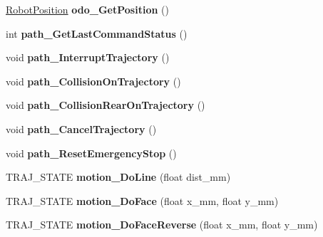 \begin{DoxyCompactItemize}
\mbox{\label{classAsservEsialR_a498af11ad6c351bbc908e1d81ff44044}} 
\hyperlink{structRobotPosition}{Robot\+Position} {\bfseries odo\+\_\+\+Get\+Position} ()
\item 
\mbox{\label{classAsservEsialR_a05e8f01586ff447aa362a99ca370cb1c}} 
int {\bfseries path\+\_\+\+Get\+Last\+Command\+Status} ()
\item 
\mbox{\label{classAsservEsialR_afd68af9e59ff80e079d3b080516be850}} 
void {\bfseries path\+\_\+\+Interrupt\+Trajectory} ()
\item 
\mbox{\label{classAsservEsialR_a6b193a4388b5e6fd562ff151e55c734b}} 
void {\bfseries path\+\_\+\+Collision\+On\+Trajectory} ()
\item 
\mbox{\label{classAsservEsialR_ab4381768623b06e165aedba58bdded56}} 
void {\bfseries path\+\_\+\+Collision\+Rear\+On\+Trajectory} ()
\item 
\mbox{\label{classAsservEsialR_a1ad80dbe60204917444a820d70c6b194}} 
void {\bfseries path\+\_\+\+Cancel\+Trajectory} ()
\item 
\mbox{\label{classAsservEsialR_a89c3ed56d870037964c23bb657c75a7a}} 
void {\bfseries path\+\_\+\+Reset\+Emergency\+Stop} ()
\item 
\mbox{\label{classAsservEsialR_a163832308cf0ea6fb9826fd93950c7bf}} 
T\+R\+A\+J\+\_\+\+S\+T\+A\+TE {\bfseries motion\+\_\+\+Do\+Line} (float dist\+\_\+mm)
\item 
\mbox{\label{classAsservEsialR_a6a899cd76df83e244789f7b1f048ba84}} 
T\+R\+A\+J\+\_\+\+S\+T\+A\+TE {\bfseries motion\+\_\+\+Do\+Face} (float x\+\_\+mm, float y\+\_\+mm)
\item 
\mbox{\label{classAsservEsialR_a586ce569271c0cd970df536b1c1d38d1}} 
T\+R\+A\+J\+\_\+\+S\+T\+A\+TE {\bfseries motion\+\_\+\+Do\+Face\+Reverse} (float x\+\_\+mm, float y\+\_\+mm)
\item 
\mbox{\label{classAsservEsialR_a71a6761ebf937db24c35bd559cd9d836}} 

\end{DoxyCompactItemize}
